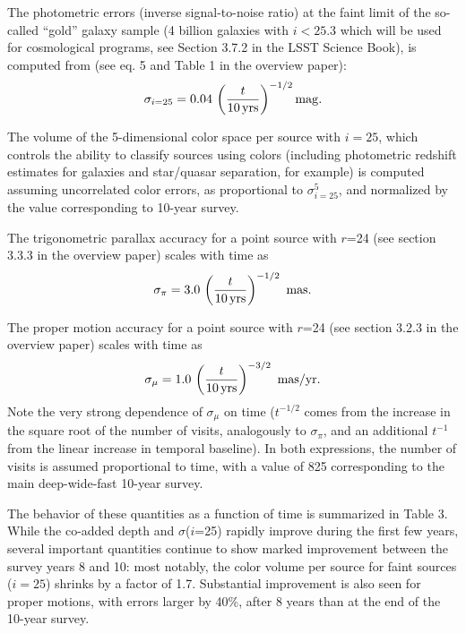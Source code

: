 \documentclass[DM,lsstdraft,toc,usenatbib]{lsstdoc}
\begin{document}
The photometric errors (inverse signal-to-noise ratio) at the faint limit of the so-called 
``gold'' galaxy sample (4 billion galaxies with $i<25.3$ which will be used for cosmological
programs, see Section 3.7.2 in the LSST Science Book), is computed from (see eq. 5 and Table 1 
in the overview paper):
\begin{equation} 
                \sigma_{i=25} = 0.04 \, \left({t \over 10 \, {\rm yrs}}\right)^{-1/2} {\rm mag.}
\end{equation}

The volume of the 5-dimensional color space per source with $i=25$,  which controls the ability 
to classify sources using colors (including photometric redshift estimates for galaxies and star/quasar
separation, for example) is computed assuming uncorrelated color errors, as proportional
to $\sigma^5_{i=25}$, and normalized by the value corresponding to 10-year survey. 

The trigonometric parallax accuracy for a point source with $r$=24 (see section 3.3.3 in the 
overview paper) scales with time as 
\begin{equation}
        \sigma_\pi = 3.0 \,  \left({t \over 10 \, {\rm yrs}}\right)^{-1/2}  \,\,  {\rm mas.} 
\end{equation}

The proper motion accuracy for a point source with $r$=24 (see section 3.2.3 in the overview paper)
scales with time as 
\begin{equation}
        \sigma_\mu = 1.0 \,  \left({t \over 10 \, {\rm yrs}}\right)^{-3/2}   \,\, {\rm mas/yr.} 
\end{equation}
Note the very strong dependence of  $\sigma_\mu$ on time ($t^{-1/2}$ comes from the
increase in the square root of the number of visits, analogously to $\sigma_\pi$, and 
an additional $t^{-1}$ from the linear increase in temporal baseline).  In both expressions,
the number of visits is assumed proportional to time, with a value of 825 corresponding to the 
main deep-wide-fast 10-year survey. 

The behavior of these quantities as a function of time is summarized in Table 3. While 
the co-added depth and $\sigma$($i$=25) rapidly improve during the first few years, 
several important quantities continue to show marked improvement between the survey 
years 8 and 10: most notably, the color volume per source for faint sources ($i=25$) 
shrinks by a factor of 1.7.  Substantial improvement is also seen for proper motions, 
with errors larger by 40\%, after 8 years than at the end of the 10-year survey.  
\end{document}
